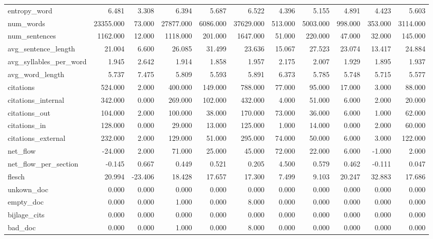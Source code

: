\begin{tabular}{lrrrrrrrrrr}
\cline{1-11}
entropy\_word & 6.481 & 3.308 & 6.394 & 5.687 & 6.522 & 4.396 & 5.155 & 4.891 & 4.423 & 5.603 \\
\cline{1-11}
num\_words & 23355.000 & 73.000 & 27877.000 & 6086.000 & 37629.000 & 513.000 & 5003.000 & 998.000 & 353.000 & 3114.000 \\
\cline{1-11}
num\_sentences & 1162.000 & 12.000 & 1118.000 & 201.000 & 1647.000 & 51.000 & 220.000 & 47.000 & 32.000 & 145.000 \\
\cline{1-11}
avg\_sentence\_length & 21.004 & 6.600 & 26.085 & 31.499 & 23.636 & 15.067 & 27.523 & 23.074 & 13.417 & 24.884 \\
\cline{1-11}
avg\_syllables\_per\_word & 1.945 & 2.642 & 1.914 & 1.858 & 1.957 & 2.175 & 2.007 & 1.929 & 1.895 & 1.937 \\
\cline{1-11}
avg\_word\_length & 5.737 & 7.475 & 5.809 & 5.593 & 5.891 & 6.373 & 5.785 & 5.748 & 5.715 & 5.577 \\
\cline{1-11}
citations & 524.000 & 2.000 & 400.000 & 149.000 & 788.000 & 77.000 & 95.000 & 17.000 & 3.000 & 88.000 \\
\cline{1-11}
citations\_internal & 342.000 & 0.000 & 269.000 & 102.000 & 432.000 & 4.000 & 51.000 & 6.000 & 2.000 & 20.000 \\
\cline{1-11}
citations\_out & 104.000 & 2.000 & 100.000 & 38.000 & 170.000 & 73.000 & 36.000 & 6.000 & 1.000 & 62.000 \\
\cline{1-11}
citations\_in & 128.000 & 0.000 & 29.000 & 13.000 & 125.000 & 1.000 & 14.000 & 0.000 & 2.000 & 60.000 \\
\cline{1-11}
citations\_external & 232.000 & 2.000 & 129.000 & 51.000 & 295.000 & 74.000 & 50.000 & 6.000 & 3.000 & 122.000 \\
\cline{1-11}
net\_flow & -24.000 & 2.000 & 71.000 & 25.000 & 45.000 & 72.000 & 22.000 & 6.000 & -1.000 & 2.000 \\
\cline{1-11}
net\_flow\_per\_section & -0.145 & 0.667 & 0.449 & 0.521 & 0.205 & 4.500 & 0.579 & 0.462 & -0.111 & 0.047 \\
\cline{1-11}
flesch & 20.994 & -23.406 & 18.428 & 17.657 & 17.300 & 7.499 & 9.103 & 20.247 & 32.883 & 17.686 \\
\cline{1-11}
unkown\_doc & 0.000 & 0.000 & 0.000 & 0.000 & 0.000 & 0.000 & 0.000 & 0.000 & 0.000 & 0.000 \\
\cline{1-11}
empty\_doc & 0.000 & 0.000 & 1.000 & 0.000 & 8.000 & 0.000 & 0.000 & 0.000 & 0.000 & 0.000 \\
\cline{1-11}
bijlage\_cits & 0.000 & 0.000 & 0.000 & 0.000 & 0.000 & 0.000 & 0.000 & 0.000 & 0.000 & 0.000 \\
\cline{1-11}
bad\_doc & 0.000 & 0.000 & 1.000 & 0.000 & 8.000 & 0.000 & 0.000 & 0.000 & 0.000 & 0.000 \\
\cline{1-11}
\bottomrule
\end{tabular}
